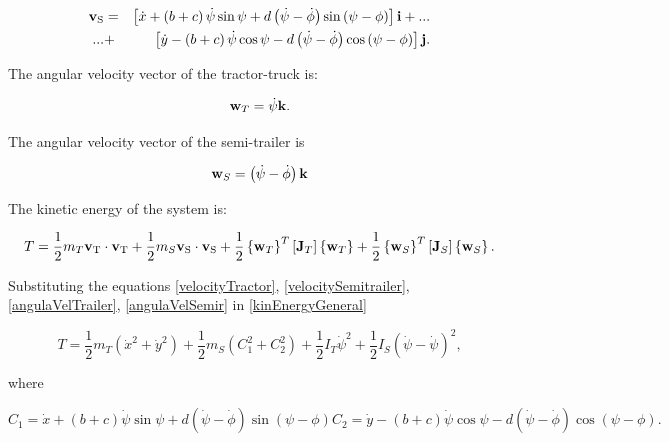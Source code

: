 \documentclass[sublist,a4paper,twoside,11pt]{article}
\begin{document}
\begin{eqnarray} \label{velocitySemitrailer}
    \nonumber
    {\bf v}_{\rm S} &=& \left[ \dot{x} + \left( b + c \right) \dot{\psi} \sin \psi + d \left( \dot{\psi} - \dot{\phi} \right) \sin \left( \psi - \phi \right) \right] {\bf i} + ... \\
    \nonumber
     ... &+& \left[ \dot{y} - \left( b + c \right) \dot{\psi} \cos \psi - d \left( \dot{\psi} - \dot{\phi} \right) \cos \left( \psi - \phi \right) \right] {\bf j}. \\
\end{eqnarray}


The angular velocity vector of the tractor-truck is:

\begin{equation} \label{angulaVelTrailer}
    {\bf w}_T = \dot{\psi} {\bf k}.
\end{equation}

The angular velocity vector of the semi-trailer is

\begin{equation} \label{angulaVelSemir}
    {\bf w}_S = \left( \dot{\psi} - \dot{\phi} \right) {\bf k}
\end{equation}

The kinetic energy of the system is:

\begin{equation} \label{kinEnergyGeneral}
    T = \frac{1}{2} m_{T} {\bf v}_{\rm T} \cdot {\bf v}_{\rm T} + \frac{1}{2} m_{S} {\bf v}_{\rm S} \cdot {\bf v}_{\rm S} + \frac{1}{2} \left\{ {\bf w}_T \right\}^T \left[ {\bf J}_T \right] \left\{ {\bf w}_T \right\} + \frac{1}{2} \left\{ {\bf w}_S \right\}^T \left[ {\bf J}_S \right] \left\{ {\bf w}_S \right\}.
\end{equation}

Substituting the equations \eqref {velocityTractor}, \eqref {velocitySemitrailer}, \eqref {angulaVelTrailer}, \eqref {angulaVelSemir} in \eqref {kinEnergyGeneral}

\begin{equation} \label{kinEnergyCoord}
    T = \frac{1}{2} m_{T} \left( \dot{x}^2 + \dot{y}^2 \right) + \frac{1}{2} m_{S} \left( C_1^2 + C_2^2 \right) + \frac{1}{2} I_{T} \dot{\psi}^2 + \frac{1}{2} I_{S} \left( \dot{\psi} - \dot{\psi} \right)^2,
\end{equation}

where 

\begin{subequations} \label{constants}
\begin{equation}
    C_1 = \dot{x} + \left( b + c \right) \dot{\psi} \sin \psi + d \left( \dot{\psi} - \dot{\phi} \right) \sin \left( \psi - \phi \right)
\end{equation}
\begin{equation}
    C_2 = \dot{y} - \left( b + c \right) \dot{\psi} \cos \psi - d \left( \dot{\psi} - \dot{\phi} \right) \cos \left( \psi - \phi \right).
\end{equation}
\end{subequations}
\end{document}
